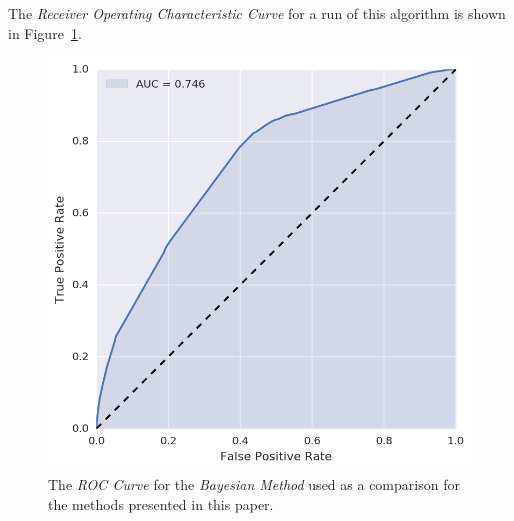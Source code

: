 The \emph{Receiver Operating Characteristic Curve} for a run of this algorithm is shown in Figure~\ref{fig:bayesian_roc}.

\begin{figure}
\centering
\includegraphics[height=.24\textheight]{figures/bayesian_roc.png}
\caption{The \emph{ROC Curve} for the \emph{Bayesian Method} used as a comparison for the methods presented in this paper.}
\label{fig:bayesian_roc}
\end{figure}

